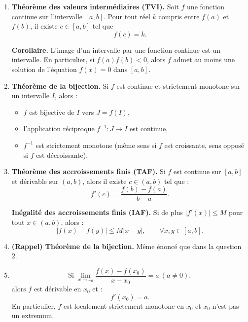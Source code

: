 \documentclass[12pt,a4paper]{article}
\begin{document}
\begin{enumerate}

\item \textbf{Théorème des valeurs intermédiaires (TVI).}  
Soit \(f\) une fonction continue sur l’intervalle \([a,b]\).  
Pour tout réel \(k\) compris entre \(f(a)\) et \(f(b)\), il existe \(c \in [a,b]\) tel que  
\[
f(c) = k.
\]

\textbf{Corollaire.}  
L’image d’un intervalle par une fonction continue est un intervalle.  
En particulier, si \(f(a)f(b) < 0\), alors \(f\) admet au moins une solution de l’équation \(f(x)=0\) dans \([a,b]\).

\item \textbf{Théorème de la bijection.}  
Si \(f\) est continue et strictement monotone sur un intervalle \(I\), alors :
\begin{itemize}
    \item \(f\) est bijective de \(I\) vers \(J=f(I)\),
    \item l’application réciproque \(f^{-1} : J \to I\) est continue,
    \item \(f^{-1}\) est strictement monotone (même sens si \(f\) est croissante, sens opposé si \(f\) est décroissante).
\end{itemize}

\item \textbf{Théorème des accroissements finis (TAF).}  
Si \(f\) est continue sur \([a,b]\) et dérivable sur \((a,b)\), alors il existe \(c \in (a,b)\) tel que :
\[
f'(c) = \frac{f(b) - f(a)}{b - a}.
\]

\textbf{Inégalité des accroissements finis (IAF).}  
Si de plus \(|f'(x)| \le M\) pour tout \(x \in (a,b)\), alors :
\[
|f(x) - f(y)| \le M |x - y|,\qquad \forall x,y \in [a,b].
\]

\item \textbf{(Rappel) Théorème de la bijection.}  
Même énoncé que dans la question 2.

\item \[
\text{Si } \lim_{x \to x_0} \frac{f(x)-f(x_0)}{x-x_0} = a \ (a \neq 0),
\]
alors \(f\) est dérivable en \(x_0\) et :
\[
f'(x_0) = a.
\]
En particulier, \(f\) est localement strictement monotone en \(x_0\) et \(x_0\) n’est pas un extremum.


\end{enumerate}
\end{document}
